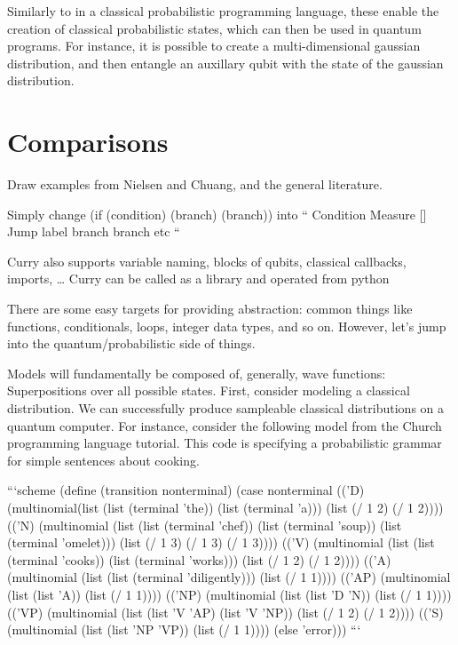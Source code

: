 \documentclass[journal]{IEEEtran}
\begin{document}
    Similarly to in a classical probabilistic programming language, these enable the creation of classical probabilistic states, which can then be used in quantum programs.
    For instance, it is possible to create a multi-dimensional gaussian distribution, and then entangle an auxillary qubit with the state of the gaussian distribution.


\section{Comparisons}

    Draw examples from Nielsen and Chuang, and the general literature.

 Simply change (if (condition) (branch) (branch))
 into
 ``
 Condition
 Measure []
 Jump label
 branch
 branch etc
 ``
 
 Curry also supports variable naming, blocks of qubits, classical callbacks, imports, \dots
 Curry can be called as a library and operated from python
 
 There are some easy targets for providing abstraction: common things like functions, conditionals, loops, integer data types, and so on. 
 However, let's jump into the quantum/probabilistic side of things.
 
 Models will fundamentally be composed of, generally, wave functions: Superpositions over all possible states.
 First, consider modeling a classical distribution. 
 We can successfully produce sampleable classical distributions on a quantum computer.
 For instance, consider the following model from the Church programming language tutorial.
 This code is specifying a probabilistic grammar for simple sentences about cooking.
 
 ```scheme
 (define (transition nonterminal)
   (case nonterminal
         (('D) (multinomial(list (list (terminal 'the))
                                 (list (terminal 'a)))
                           (list (/ 1 2) (/ 1 2))))
         (('N) (multinomial (list (list (terminal 'chef))
                                  (list (terminal 'soup))
                                  (list (terminal 'omelet)))
                            (list (/ 1 3) (/ 1 3) (/ 1 3))))
         (('V) (multinomial (list (list (terminal 'cooks))
                                  (list (terminal 'works)))
                            (list (/ 1 2) (/ 1 2))))
         (('A) (multinomial (list (list (terminal 'diligently)))
                            (list (/ 1 1))))
         (('AP) (multinomial (list (list 'A))
                             (list (/ 1 1))))
         (('NP) (multinomial (list (list 'D 'N))
                             (list (/ 1 1))))
         (('VP) (multinomial (list (list 'V 'AP)
                                   (list 'V 'NP))
                             (list (/ 1 2) (/ 1 2))))
         (('S) (multinomial (list (list 'NP 'VP))
                            (list (/ 1 1))))
         (else 'error)))
 ```
 
\end{document}
